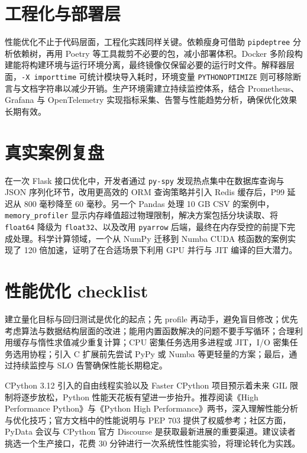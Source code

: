 \chapter{工程化与部署层}
性能优化不止于代码层面，工程化实践同样关键。依赖瘦身可借助 \texttt{pipdeptree} 分析依赖树，再用 Poetry 等工具裁剪不必要的包，减小部署体积。Docker 多阶段构建能将构建环境与运行环境分离，最终镜像仅保留必要的运行时文件。解释器层面，\texttt{-X importtime} 可统计模块导入耗时，环境变量 \texttt{PYTHONOPTIMIZE} 则可移除断言与文档字符串以减少开销。生产环境需建立持续监控体系，结合 Prometheus、Grafana 与 OpenTelemetry 实现指标采集、告警与性能趋势分析，确保优化效果长期有效。\par
\chapter{真实案例复盘}
在一次 Flask 接口优化中，开发者通过 \texttt{py-spy} 发现热点集中在数据库查询与 JSON 序列化环节，改用更高效的 ORM 查询策略并引入 Redis 缓存后，P99 延迟从 800 毫秒降至 60 毫秒。另一个 Pandas 处理 10 GB CSV 的案例中，\texttt{memory\_{}profiler} 显示内存峰值超过物理限制，解决方案包括分块读取、将 \texttt{float64} 降级为 \texttt{float32}、以及改用 \texttt{pyarrow} 后端，最终在内存受控的前提下完成处理。科学计算领域，一个从 NumPy 迁移到 Numba CUDA 核函数的案例实现了 120 倍加速，证明了在合适场景下利用 GPU 并行与 JIT 编译的巨大潜力。\par
\chapter{性能优化 checklist}
建立量化目标与回归测试是优化的起点；先 profile 再动手，避免盲目修改；优先考虑算法与数据结构层面的改进；能用内置函数解决的问题不要手写循环；合理利用缓存与惰性求值减少重复计算；CPU 密集任务选用多进程或 JIT，I/O 密集任务选用协程；引入 C 扩展前先尝试 PyPy 或 Numba 等更轻量的方案；最后，通过持续监控与 SLO 告警确保性能长期稳定。\par
CPython 3.12 引入的自由线程实验以及 Faster CPython 项目预示着未来 GIL 限制将逐步放松，Python 性能天花板有望进一步抬升。推荐阅读《High Performance Python》与《Python High Performance》两书，深入理解性能分析与优化技巧；官方文档中的性能说明与 PEP 703 提供了权威参考；社区方面，PyData 会议与 CPython 官方 Discourse 是获取最新进展的重要渠道。建议读者挑选一个生产接口，花费 30 分钟进行一次系统性性能实验，将理论转化为实践。\par
